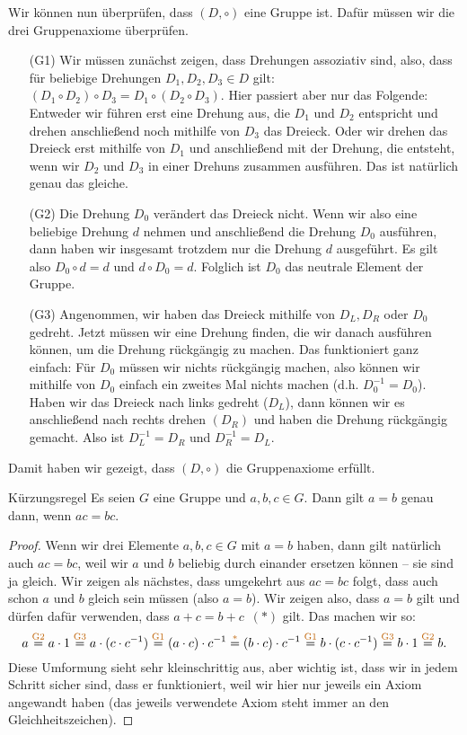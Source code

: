 \documentclass[../../main.tex]{subfiles}
\begin{document}
\begin{example}{}
    Wir können nun überprüfen, dass $(D,\circ)$ eine Gruppe ist. Dafür müssen wir die drei Gruppenaxiome überprüfen.
    \begin{enumerate}
        \item[(G1)] Wir müssen zunächst zeigen, dass Drehungen assoziativ sind, also, dass für beliebige Drehungen $D_1,D_2,D_3\in D$ gilt: $(D_1\circ D_2)\circ D_3=D_1\circ (D_2\circ D_3)$. Hier passiert aber nur das Folgende: Entweder wir führen erst eine Drehung aus, die $D_1$ und $D_2$ entspricht und drehen anschließend noch mithilfe von $D_3$ das Dreieck. Oder wir drehen das Dreieck erst mithilfe von $D_1$ und anschließend mit der Drehung, die entsteht, wenn wir $D_2$ und $D_3$ in einer Drehuns zusammen ausführen. Das ist natürlich genau das gleiche.
        \item[(G2)] Die Drehung $D_0$ verändert das Dreieck nicht. Wenn wir also eine beliebige Drehung $d$ nehmen und anschließend die Drehung $D_0$ ausführen, dann haben wir insgesamt trotzdem nur die Drehung $d$ ausgeführt. Es gilt also $D_0\circ d=d$ und $d\circ D_0=d$. Folglich ist $D_0$ das neutrale Element der Gruppe.
        \item[(G3)] Angenommen, wir haben das Dreieck mithilfe von $D_L, D_R$ oder $D_0$ gedreht. Jetzt müssen wir eine Drehung finden, die wir danach ausführen können, um die Drehung rückgängig zu machen. Das funktioniert ganz einfach: Für $D_0$ müssen wir nichts rückgängig machen, also können wir mithilfe von $D_0$ einfach ein zweites Mal nichts machen (d.h. $D_0^{-1}=D_0$). Haben wir das Dreieck nach links gedreht ($D_L$), dann können wir es anschließend nach rechts drehen $(D_R)$ und haben die Drehung rückgängig gemacht. Also ist $D_L^{-1}=D_R$ und $D_R^{-1}=D_L$.
    \end{enumerate}
    Damit haben wir gezeigt, dass $(D,\circ)$ die Gruppenaxiome erfüllt.
\end{example}

\begin{theorem}{Kürzungsregel}
    Es seien $G$ eine Gruppe und $a,b,c \in G$. Dann gilt $a=b$ genau dann, wenn $ac=bc$.
\end{theorem}
\begin{proof}
     Wenn wir drei Elemente $a,b,c \in G$ mit $a=b$ haben, dann gilt natürlich auch $ac=bc$, weil wir $a$ und $b$ beliebig durch einander ersetzen können -- sie sind ja gleich. Wir zeigen als nächstes, dass umgekehrt aus $ac=bc$ folgt, dass auch schon $a$ und $b$ gleich sein müssen (also $a=b$). Wir zeigen also, dass $a=b$ gilt und dürfen dafür verwenden, dass \mbox{$a+c=b+c$ \textcolor{orange!75!black}{$(*)$}} gilt. Das machen wir so:
    \[a\axiom{G2}a\cdot 1\axiom{G3}a\cdot(c\cdot c^{-1})\axiom{G1}(a\cdot c)\cdot c^{-1}\axiom{$*$}(b\cdot c)\cdot c^{-1}\axiom{G1}b\cdot (c\cdot c^{-1})\axiom{G3}b\cdot 1\axiom{G2}b.\]
    Diese Umformung sieht sehr kleinschrittig aus, aber wichtig ist, dass wir in jedem Schritt sicher sind, dass er funktioniert, weil wir hier nur jeweils ein Axiom angewandt haben (das jeweils verwendete Axiom steht immer an den Gleichheitszeichen).
    
\end{proof}

\newpage
\pagecolor{white}
\end{document}
